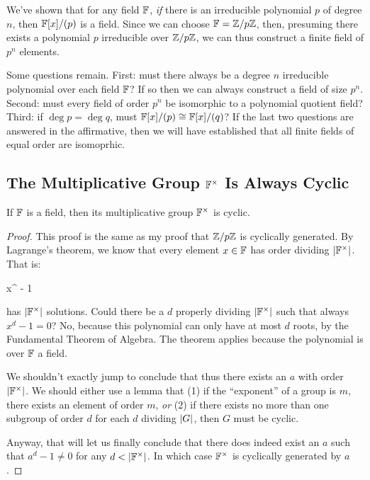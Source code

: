 \begin{remark}
  We've shown that for any field $\mathbb{F}$, \emph{if} there is an irreducible
  polynomial $p$ of degree $n$, then $\mathbb{F}[x]/(p)$ is a field. Since we
  can choose $\mathbb{F} = \mathbb{Z} / p\mathbb{Z}$, then, presuming there exists a polynomial
  $p$ irreducible over $\mathbb{Z} / p\mathbb{Z}$, we can thus construct a finite field of
  $p^n$ elements.

  Some questions remain. First: must there always be a degree $n$
  irreducible polynomial over each field $\mathbb{F}$? If so then we can always
  construct a field of size $p^n$. Second: must every field of order
  $p^n$ be isomorphic to a polynomial quotient field? Third: if $\deg p
  = \deg q$, must $\mathbb{F}[x]/(p) \cong \mathbb{F}[x]/(q)$? If the last two questions
  are answered in the affirmative, then we will have established that
  all finite fields of equal order are isomoprhic.
\end{remark}

\subsection{The Multiplicative Group $\mathbb{F}^\times$ Is Always Cyclic}

\begin{theorem}
  If $\mathbb{F}$ is a field, then its multiplicative group $\mathbb{F}^\times$ is
  cyclic.
\end{theorem}

\begin{proof}
  This proof is the same as my proof that $\mathbb{Z} / p\mathbb{Z}$ is cyclically
  generated. By Lagrange's theorem, we know that every element $x\in\mathbb{F}$
  has order dividing $|\mathbb{F}^\times|$. That is:

  \begin{nedqn}
    x^{\order{\F^\times}} - 1
  \end{nedqn}

  \noindent
  has $|\mathbb{F}^\times|$ solutions. Could there be a $d$ properly
  dividing $|\mathbb{F}^\times|$ such that always $x^d - 1 = 0$? No,
  because this polynomial can only have at most $d$ roots, by the
  Fundamental Theorem of Algebra. The theorem applies because the
  polynomial is over $\mathbb{F}$ a field.

  We shouldn't exactly jump to conclude that thus there exists an $a$
  with order $|\mathbb{F}^\times|$. We should either use a lemma that (1)
  if the ``exponent'' of a group is $m$, there exists an element of
  order $m$, \emph{or} (2) if there exists no more than one subgroup of
  order $d$ for each $d$ dividing $|G|$, then $G$ must be cyclic.

  Anyway, that will let us finally conclude that there does indeed exist
  an $a$ such that $a^d - 1 \ne 0$ for any $d < |\mathbb{F}^\times|$. In
  which case $\mathbb{F}^\times$ is cyclically generated by $a$.
\end{proof}


